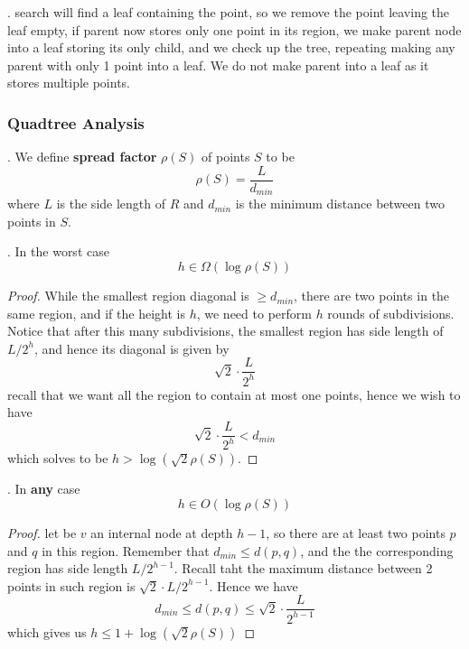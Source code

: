 \documentclass{article}
\begin{document}
\begin{codes}[].
    search will find a leaf containing the point, so we remove the point leaving the leaf empty, if parent now stores only one point in its region, we make parent node into a leaf storing its only child, and we check up the tree, repeating making any parent with only 1 point into a leaf. We do not make parent into a leaf as it stores multiple points. 
\end{codes}

\subsubsection{Quadtree Analysis} 

\begin{deff}.
    We define \textbf{spread factor} $\rho(S)$ of points $S$ to be 
    \[ \rho(S) = \frac{L}{d_{min}} \]
    where $L$ is the side length of $R$ and $d_{min}$ is the minimum distance between two points in $S$. 
\end{deff}

\begin{thmm}[].
    In the worst case 
    \[ h \in \Omega( \log \rho(S)) \]
\end{thmm}

\begin{proof}
    While the smallest region diagonal is $\geq d_{min}$, there are two points in the same region, and if the height is $h$, we need to perform $h$ rounds of subdivisions. Notice that after this many subdivisions, the smallest region has side length of $L / 2^h$, and hence its diagonal is given by 
    \[ \sqrt{2} \cdot \frac{L}{2^h} \]
    recall that we want all the region to contain at most one points, hence we wish to have 
    \[ \sqrt{2} \cdot \frac{L}{2^h} < d_{min} \]
    which solves to be $h > \log ( \sqrt{2} \rho(S) )$. 
\end{proof}

\begin{thmm}[].
    In \textbf{any} case 
    \[ h \in O( \log \rho(S)) \]
\end{thmm}

\begin{proof}
    let be $v$ an internal node at depth $h-1$, so there are at least two points $p$ and $q$ in this region. Remember that $d_{min} \leq d(p, q)$, and the the corresponding region has side length $L / 2^{h-1}$. Recall taht the maximum distance between 2 points in such region is $\sqrt{2} \cdot L / 2^{h-1}$. Hence we have 
    \[ d_{min} \leq d(p, q) \leq \sqrt{2} \cdot \frac{L}{2^{h-1}} \]
    which gives us $h \leq 1 + \log( \sqrt{2} \rho(S) )$
\end{proof}
\end{document}
